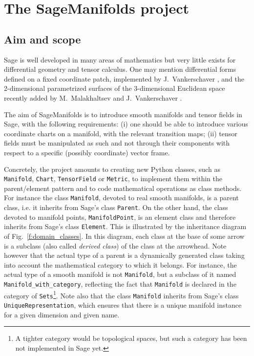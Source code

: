 \documentclass[a4paper]{jpconf}
\newcommand{\soft}[1]{\textsf{#1}}
\newcommand{\code}[1]{\texttt{#1}}
\newcommand{\Sage}{\soft{Sage}}
\newcommand{\SM}{\soft{SageManifolds}}
\begin{document}
\section{The SageManifolds project}

\subsection{Aim and scope}

\Sage{} is well developed in many areas of mathematics but 
very little exists for differential geometry and tensor calculus.
One may mention differential forms defined on a fixed coordinate patch,
implemented by J.~Vankerschaver \cite{sage_diff_form},
and the 2-dimensional parametrized surfaces of
the 3-dimensional Euclidean space recently added
 by M.~Malakhaltsev and J.~Vankerschaver
\cite{sage_param_surf}. 

The aim of \SM{} \cite{SM} is to introduce smooth manifolds and tensor fields
in \Sage{}, with the following requirements:
(i) one should be able to introduce various coordinate charts
on a manifold, with the relevant transition maps; (ii)
tensor fields must be manipulated as such and not through 
their components with respect to a specific (possibly coordinate) vector frame. 

Concretely, the project amounts to creating new Python classes,
 such as 
\code{Manifold}, \code{Chart}, \code{TensorField} or \code{Metric},
to implement them within the parent/element pattern and to 
code mathematical operations as class methods.
For instance the class \code{Manifold}, devoted to real smooth manifolds,
is a parent class, i.e. it inherits from \Sage{}'s class \code{Parent}.
On the other hand, the class devoted to manifold points, \code{ManifoldPoint}, 
is an element class and therefore inherits from \Sage{}'s class 
\code{Element}.
This is illustrated by the inheritance diagram of Fig.~\ref{f:domain_classes}.
In this diagram, each class at the base of some arrow is a subclass (also
called \emph{derived class}) of the class at the arrowhead.
Note however that the actual type of a parent is a dynamically generated
class taking into account the mathematical category to which it belongs. 
For instance, the actual type of a smooth manifold is not \code{Manifold}, but a
subclass of it named \code{Manifold\_with\_category}, 
reflecting the fact that \code{Manifold} is
declared in the category of \code{Sets}\footnote{A tighter category would be
topological spaces, but such a category has been not implemented in \Sage{} yet.}.
Note also that the class \code{Manifold} inherits from \Sage{}'s class
\texttt{UniqueRepresentation}, which ensures that there is a unique
manifold instance for a given dimension and given name. 
\end{document}
